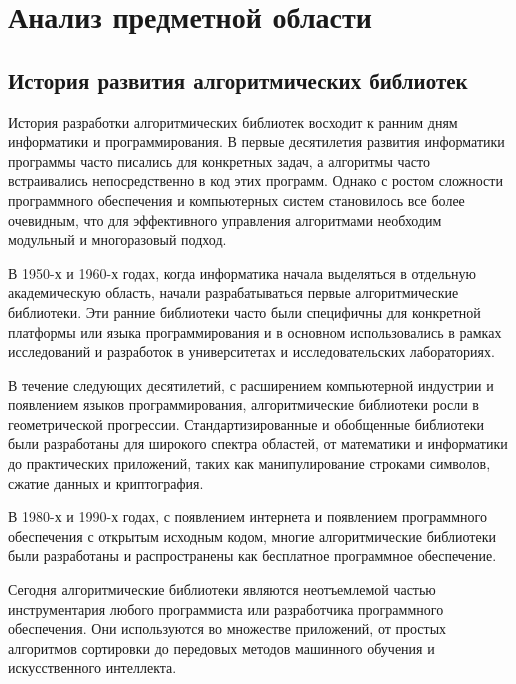 \section{Анализ предметной области}
\subsection{История развития алгоритмических библиотек}

История разработки алгоритмических библиотек восходит к ранним дням информатики и программирования. В первые десятилетия развития информатики программы часто писались для конкретных задач, а алгоритмы часто встраивались непосредственно в код этих программ. Однако с ростом сложности программного обеспечения и компьютерных систем становилось все более очевидным, что для эффективного управления алгоритмами необходим модульный и многоразовый подход.

В 1950-х и 1960-х годах, когда информатика начала выделяться в отдельную академическую область, начали разрабатываться первые алгоритмические библиотеки. Эти ранние библиотеки часто были специфичны для конкретной платформы или языка программирования и в основном использовались в рамках исследований и разработок в университетах и исследовательских лабораториях.

В течение следующих десятилетий, с расширением компьютерной индустрии и появлением языков программирования, алгоритмические библиотеки росли в геометрической прогрессии. Стандартизированные и обобщенные библиотеки были разработаны для широкого спектра областей, от математики и информатики до практических приложений, таких как манипулирование строками символов, сжатие данных и криптография.

В 1980-х и 1990-х годах, с появлением интернета и появлением программного обеспечения с открытым исходным кодом, многие алгоритмические библиотеки были разработаны и распространены как бесплатное программное обеспечение. 

Сегодня алгоритмические библиотеки являются неотъемлемой частью инструментария любого программиста или разработчика программного обеспечения. Они используются во множестве приложений, от простых алгоритмов сортировки до передовых методов машинного обучения и искусственного интеллекта. 
